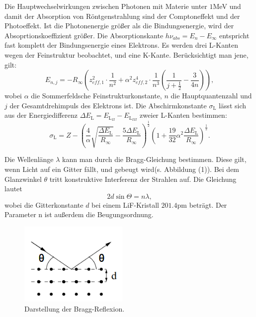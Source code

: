 \noindent Die Hauptwechselwirkungen zwischen Photonen mit Materie unter $1$MeV und damit der Absorption von Röntgenstrahlung sind der Comptoneffekt und der Photoeffekt. 
Ist die Photonenergie größer als die Bindungsenergie, wird der Absoprtionskoeffizient größer.
Die Absorptionskante $h \nu_{abs} = E_n - E_{\infty}$ entspricht fast komplett der Bindungsenergie eines Elektrons.
Es werden drei L-Kanten wegen der Feinstruktur beobachtet, und eine K-Kante. Berücksichtigt man jene, gilt:
\begin{equation}
E_{n,j} = -R_{\infty} \left( z_{eff,1}^2 \cdot \frac{1}{n^2} + \alpha^2 z_{eff,2}^4 \cdot \frac{1}{n^3}
\left(\frac{1}{j+ \frac{1}{2}} - \frac{3}{4n} \right) \right) ,
\end{equation}
wobei $\alpha$ die Sommerfeldsche Feinstrukturkonstante, $n$ die Hauptquantenzahl und $j$ der Gesamtdrehimpuls des
Elektrons ist. Die Abschirmkonstante $\sigma_\text{L}$ lässt sich aus der
Energiedifferenz $\Delta E_\text{L}=E_{\text{L}_{II}}-E_{\text{L}_{III}}$ zweier L-Kanten bestimmen:
\begin{equation}
\label{eqn:sigmal}
\sigma_\text{L}=Z-\left(\frac{4}{\alpha}\sqrt{\frac{\Delta E_\text{L}}{R_\infty}}-
\frac{5\Delta E_\text{L}}{R_\infty}\right)^{\frac{1}{2}}\left(1+\frac{19}{32}\alpha^2
\frac{\Delta E_\text{L}}{R_\infty}\right)^{\frac{1}{2}}.
\end{equation}

\noindent Die Wellenlänge $\lambda$ kann man durch die Bragg-Gleichung bestimmen. Diese gilt, wenn Licht auf ein Gitter fällt, und gebeugt wird(s. Abbildung (1)).
Bei dem Glanzwinkel $\theta$ tritt konstruktive Interferenz der Strahlen auf. 
Die Gleichung lautet
\begin{equation}
  2d \sin{\Theta} = n \lambda ,
\end{equation}
wobei die Gitterkonstante $d$ bei einem LiF-Kristall $201.4 \si{\pm}$ beträgt. Der Parameter n ist außerdem die Beugungsordnung.

\begin{figure}[H]
  \centering
  \includegraphics[height=4cm]{bragg.PNG}
  \caption{Darstellung der Bragg-Reflexion. \cite[S.2]{kent}}
\end{figure}